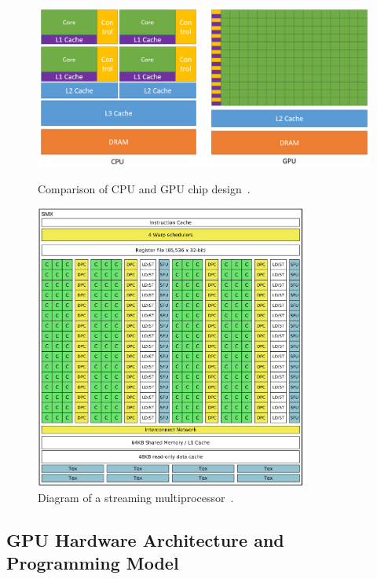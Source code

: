 \begin{figure}
	\centering
	\begin{minipage}{.5\textwidth}
        \centering
        \includegraphics[width=\textwidth]{img/cpu-gpu}
        \caption{Comparison of CPU and GPU chip design~\cite{site:cuda}.}
        \label{fig:cpu-gpu}
	\end{minipage}%
	\begin{minipage}{.5\textwidth}
        \centering
        \includegraphics[width=0.8\textwidth]{img/sm}
        \caption{Diagram of a streaming multiprocessor~\cite{navarro2014survey}.}
        \label{fig:sm}
	\end{minipage}
\end{figure}

\subsection{GPU Hardware Architecture and Programming Model}

